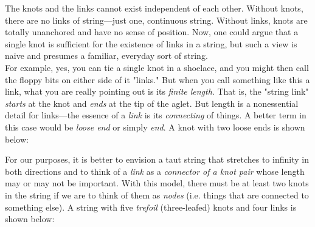 The knots and the links cannot exist independent of each other. Without knots, there are no links of string---just one, continuous string. Without links, knots are totally unanchored and have no sense of position. Now, one could argue that a single knot is sufficient for the existence of links in a string, but such a view is naive and presumes a familiar, everyday sort of string. \\

For example, yes, you can tie a single knot in a shoelace, and you might then call the floppy bits on either side of it "links." But when you call something like this a link, what you are really pointing out is its \textit{finite length}. That is, the "string link" \textit{starts} at the knot and \textit{ends} at the tip of the aglet. But length is a nonessential detail for links---the essence of a \textit{link} is its \textit{connecting} of things. A better term in this case would be \textit{loose end} or simply \textit{end}. A knot with two loose ends is shown below: \\

\begin{center}  
\end{center}

For our purposes, it is better to envision a taut string that stretches to infinity in both directions and to think of a \textit{link} as a \textit{connector of a knot pair} whose length may or may not be important. With this model, there must be at least two knots in the string if we are to think of them as \textit{nodes} (i.e. things that are connected to something else). A string with five \textit{trefoil} (three-leafed) knots and four links is shown below: \\

